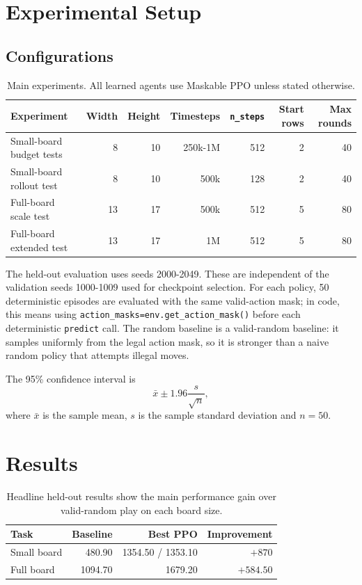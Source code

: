 \documentclass[10pt,a4paper]{article}
\begin{document}
\section{Experimental Setup}

\subsection{Configurations}

\begin{table}[H]
\centering
\caption{Main experiments. All learned agents use Maskable PPO unless stated otherwise.}
\label{tab:configs}
\small
\begin{tabular}{lrrrrrr}
\toprule
Experiment & Width & Height & Timesteps & \texttt{n\_steps} & Start rows & Max rounds \\
\midrule
Small-board budget tests & 8 & 10 & 250k-1M & 512 & 2 & 40 \\
Small-board rollout test & 8 & 10 & 500k & 128 & 2 & 40 \\
Full-board scale test & 13 & 17 & 500k & 512 & 5 & 80 \\
Full-board extended test & 13 & 17 & 1M & 512 & 5 & 80 \\
\bottomrule
\end{tabular}
\end{table}

The held-out evaluation uses seeds 2000-2049. These are independent of the validation seeds 1000-1009 used for checkpoint selection. For each policy, 50 deterministic episodes are evaluated with the same valid-action mask; in code, this means using \texttt{action\_masks=env.get\_action\_mask()} before each deterministic \texttt{predict} call. The random baseline is a valid-random baseline: it samples uniformly from the legal action mask, so it is stronger than a naive random policy that attempts illegal moves.

The 95\% confidence interval is
\[
\bar{x}\pm1.96\frac{s}{\sqrt{n}},
\]
where \(\bar{x}\) is the sample mean, \(s\) is the sample standard deviation and \(n=50\).

\section{Results}

\begin{table}[H]
\centering
\caption{Headline held-out results show the main performance gain over valid-random play on each board size.}
\label{tab:best-summary}
\small
\begin{tabular}{lrrr}
\toprule
Task & Baseline & Best PPO & Improvement \\
\midrule
Small board & 480.90 & 1354.50 / 1353.10 & \(+870\) \\
Full board & 1094.70 & 1679.20 & \(+584.50\) \\
\bottomrule
\end{tabular}
\end{table}
\end{document}

